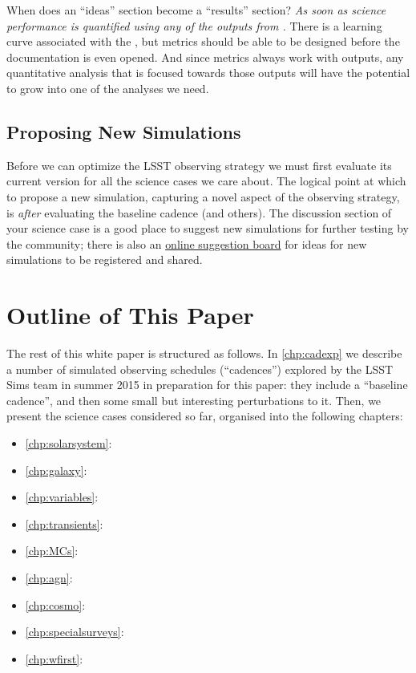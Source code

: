 When does an  ``ideas'' section become a ``results'' section? {\it As
soon as science  performance is quantified using any of the outputs from
\OpSim.} There is  a learning curve associated with the \MAF, but
metrics should be able to be designed before the \MAF documentation is
even opened. And since \MAF metrics always work with \OpSim outputs, any
quantitative analysis that is focused towards those outputs will have
the potential to grow into one of the \MAF analyses we need.


\subsection{Proposing New Simulations}

Before we can optimize the LSST observing strategy we must first
evaluate its current version for all the science cases we care about.
The logical point at which to propose a new \OpSim simulation, capturing
a novel aspect of the observing strategy, is {\it after} evaluating the
baseline  cadence (and others). The discussion section of your science
case is a good place to suggest new \OpSim simulations for further
testing by the community; there is also an
\href{https://github.com/LSSTScienceCollaborations/ObservingStrategy/blob/master/opsim/README.md}{online
suggestion board} for ideas for new  simulations to be registered and
shared.

\navigationbar


\section{Outline of This Paper}
\def\secname{intro:outline}\label{sec:\secname}

The rest of this white paper is structured as follows. In
\autoref{chp:cadexp} we describe a number of \OpSim simulated observing
schedules (``cadences'') explored by the LSST Sims team in summer 2015
in preparation for this paper: they include a ``baseline cadence'', and
then some small but interesting perturbations to it. Then, we present
the science cases considered so far, organised into the following
chapters:

\begin{itemize}
    \item \autoref{chp:solarsystem}: 
    \item \autoref{chp:galaxy}: 
    \item \autoref{chp:variables}: 
    \item \autoref{chp:transients}: 
    \item \autoref{chp:MCs}: 
    \item \autoref{chp:agn}: 
    \item \autoref{chp:cosmo}: 
    \item \autoref{chp:specialsurveys}: 
    \item \autoref{chp:wfirst}: 
\end{itemize}

